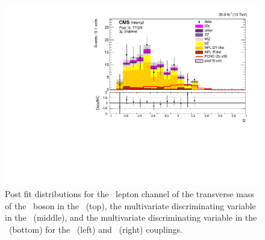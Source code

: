 \begin{figure}[htbp]
	\includegraphics[width=0.49\linewidth]{6_Search/Figures/ZctFit/New/shapes_fit_s_LepChan_3mu_TTSR_error_trial.pdf}
	\caption{Post fit distributions for the \mumumu\ lepton channel of the transverse mass of the \PW\ boson in the \WZCR\ (top), the multivariate discriminating variable in the \STSR\ (middle), and the multivariate discriminating variable in the \TTSR\ (bottom) for the \Zut\ (left) and \Zct\ (right) couplings. }
	\label{fig:shapesfit3mu}
\end{figure}


